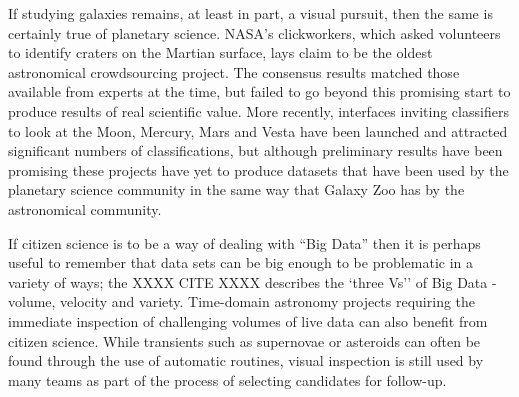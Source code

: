 \documentclass{ar2e}
\begin{document}
If studying galaxies remains, at least in part, a visual pursuit, then the same
is certainly true of planetary science. NASA's clickworkers, which asked
volunteers to identify craters on the Martian surface, lays claim to be the
oldest astronomical crowdsourcing project. The consensus results matched those
available from experts at the time, but failed to go beyond this promising start
to produce results of real scientific value. More recently, interfaces inviting
classifiers to look at the Moon, Mercury, Mars and Vesta have been launched and
attracted significant numbers of classifications, but although preliminary
results have been promising these projects have yet to produce datasets that
have been used by the planetary science community in the same way that Galaxy
Zoo has by the astronomical community. 







If citizen science is to be a way of dealing with ``Big Data'' then it is
perhaps useful to remember that data sets can be big enough to be problematic in
a variety of ways; the XXXX CITE XXXX describes the `three Vs'' of Big Data -
volume, velocity and variety. Time-domain astronomy projects requiring the
immediate inspection of challenging  volumes of live data can also benefit from
citizen science. While transients such as supernovae or asteroids can often be
found through the use of automatic routines, visual inspection is still used by
many teams as part of the process of selecting candidates for follow-up. 

\end{document}
